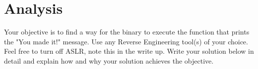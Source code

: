 \documentclass[answers]{exam}
\begin{document}
\section*{Analysis}
Your objective is to find a way for the binary to execute the function that
prints the "You made it!" message. Use any Reverse Engineering tool(s) of your
choice. Feel free to turn off ASLR, note this in the write up. Write your solution
below in detail and explain how and why your solution achieves the objective.
\begin{solution}
\end{solution}
\end{document}
